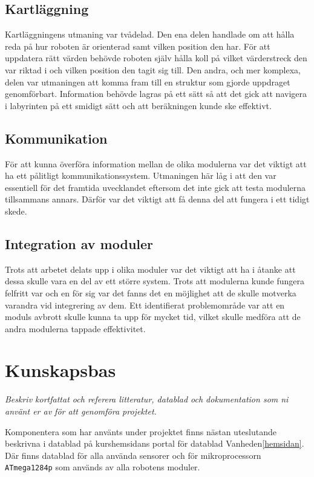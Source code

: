 \documentclass[11pt]{article}
\begin{document}
\begin{flushleft}
\subsection{Kartläggning}
Kartläggningens utmaning var tvådelad. Den ena delen handlade om att hålla reda på hur roboten är orienterad samt vilken position den har. För att uppdatera rätt värden behövde roboten själv hålla koll på vilket värderstreck den var riktad i och vilken position den tagit sig till. Den andra, och mer komplexa, delen var utmaningen att komma fram till en struktur som gjorde uppdraget genomförbart. Information behövde lagras på ett sätt så att det gick att navigera i labyrinten på ett smidigt sätt och att beräkningen kunde ske effektivt.

\subsection{Kommunikation}
För att kunna överföra information mellan de olika modulerna var det viktigt att ha ett pålitligt kommunikationssystem. Utmaningen här låg i att den var essentiell för det framtida uvecklandet eftersom det inte gick att testa modulerna tillsammans annars. Därför var det viktigt att få denna del att fungera i ett tidigt skede.

\subsection{Integration av moduler}

Trots att arbetet delats upp i olika moduler var det viktigt att ha i åtanke att dessa skulle vara en del av ett större system. Trots att modulerna kunde fungera felfritt var och en för sig var det fanns det en möjlighet att de skulle motverka varandra vid integrering av dem. Ett identifierat problemområde var att en moduls avbrott skulle kunna ta upp för mycket tid, vilket skulle medföra att de andra modulerna tappade effektivitet. 


\pagebreak

\section{Kunskapsbas}
\textit{Beskriv kortfattat och referera litteratur, datablad och dokumentation som ni använt er av för att genomföra projektet.}

Komponentera som har använts under projektet finns nästan uteslutande beskrivna i datablad på kurshemsidans portal för datablad Vanheden\ref{hemsidan}. Där finns datablad för alla använda sensorer och för mikroprocessorn \verb+ATmega1284p+ som används av alla robotens moduler.


\end{flushleft}
\end{document}
